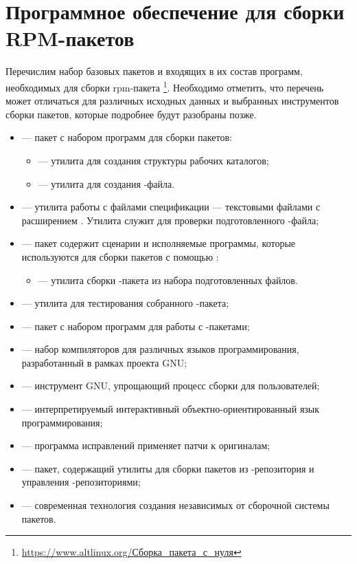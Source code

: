 \hypertarget{3.2}{\section{Программное обеспечение для сборки RPM-пакетов}}

Перечислим набор базовых пакетов и входящих в их состав программ, необходимых для
сборки rpm-пакета%
\footnote{\href{https://www.altlinux.org/\%D0\%A1\%D0\%B1\%D0\%BE\%D1\%80\%D0\%BA\%D0\%B0_\%D0\%BF\%D0\%B0\%D0\%BA\%D0\%B5\%D1\%82\%D0\%B0_\%D1\%81_\%D0\%BD\%D1\%83\%D0\%BB\%D1\%8F}%
{https://www.altlinux.org/Сборка\_пакета\_с\_нуля}}.
Необходимо отметить, что перечень может отличаться для различных исходных данных
и выбранных инструментов сборки пакетов, которые подробнее будут разобраны позже.

\begin{itemize}
	\item {} --- пакет с набором программ для сборки пакетов:
	\begin{itemize}
		\item {} --- утилита для создания структуры рабочих каталогов;
		\item {} --- утилита для создания -файла.
	\end{itemize}
	\item {} --- утилита работы с файлами спецификации --- текстовыми файлами с расширением
		. Утилита служит для проверки подготовленного -файла;
	\item {} --- пакет содержит сценарии и исполняемые программы, которые используются для сборки пакетов с помощью :
	\begin{itemize}
		\item {} --- утилита сборки -пакета из набора подготовленных файлов.
	\end{itemize}
	\item {} --- утилита для тестирования собранного -пакета;
	\item {} --- пакет с набором программ для работы с -пакетами;
	\item {} --- набор компиляторов для различных языков программирования, разработанный в рамках проекта GNU;
	\item {} --- инструмент GNU, упрощающий процесс сборки для пользователей;
	\item {} --- интерпретируемый интерактивный объектно-ориентированный язык программирования;
	\item {} --- программа исправлений применяет патчи к оригиналам;
	\item {} --- пакет, содержащий утилиты для сборки пакетов  из -репозитория и управления -репозиториями;
	\item {} --- современная технология создания независимых от сборочной системы пакетов.
\end{itemize}

